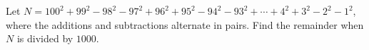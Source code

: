 Let $N=100^2+99^2-98^2-97^2+96^2+95^2-94^2-93^2+\cdots+4^2+3^2-2^2-1^2$, where the additions and subtractions alternate in pairs. Find the remainder when $N$ is divided by $1000$.
